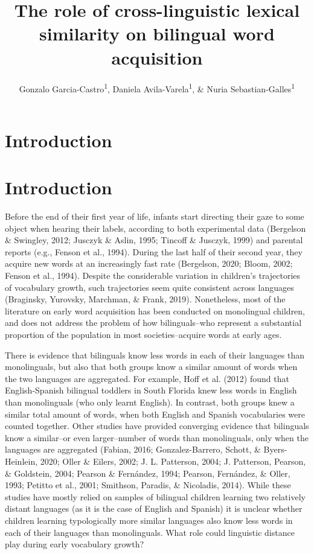 \documentclass[
  english,
  man,man,floatsintext]{apa6}
\title{The role of cross-linguistic lexical similarity on bilingual word acquisition}
\author{Gonzalo Garcia-Castro\textsuperscript{1}, Daniela Avila-Varela\textsuperscript{1}, \& Nuria Sebastian-Galles\textsuperscript{1}}
\date{}
\affiliation{\vspace{0.5cm}\textsuperscript{1} Center for Brain and Cognition, Universitat Pompeu Fabra, Barcelona, Spain}
\begin{document}
\maketitle

\hypertarget{introduction}{%
\section{Introduction}\label{introduction}}

\hypertarget{introduction-1}{%
\section{Introduction}\label{introduction-1}}

Before the end of their first year of life, infants start directing their gaze to some object when hearing their labels, according to both experimental data (Bergelson \& Swingley, 2012; Jusczyk \& Aslin, 1995; Tincoff \& Jusczyk, 1999) and parental reports (e.g., Fenson et al., 1994). During the last half of their second year, they acquire new words at an increasingly fast rate (Bergelson, 2020; Bloom, 2002; Fenson et al., 1994). Despite the considerable variation in children's trajectories of vocabulary growth, such trajectories seem quite consistent across languages (Braginsky, Yurovsky, Marchman, \& Frank, 2019). Nonetheless, most of the literature on early word acquisition has been conducted on monolingual children, and does not address the problem of how bilinguals--who represent a substantial proportion of the population in most societies--acquire words at early ages.

There is evidence that bilinguals know less words in each of their languages than monolinguals, but also that both groups know a similar amount of words when the two languages are aggregated. For example, Hoff et al. (2012) found that English-Spanish bilingual toddlers in South Florida knew less words in English than monolinguals (who only learnt English). In contrast, both groups knew a similar total amount of words, when both English and Spanish vocabularies were counted together. Other studies have provided converging evidence that bilinguals know a similar--or even larger--number of words than monolinguals, only when the languages are aggregated (Fabian, 2016; Gonzalez-Barrero, Schott, \& Byers-Heinlein, 2020; Oller \& Eilers, 2002; J. L. Patterson, 2004; J. Patterson, Pearson, \& Goldstein, 2004; Pearson \& Fernández, 1994; Pearson, Fernández, \& Oller, 1993; Petitto et al., 2001; Smithson, Paradis, \& Nicoladis, 2014). While these studies have mostly relied on samples of bilingual children learning two relatively distant languages (as it is the case of English and Spanish) it is unclear whether children learning typologically more similar languages also know less words in each of their languages than monolinguals. What role could linguistic distance play during early vocabulary growth?
\end{document}
